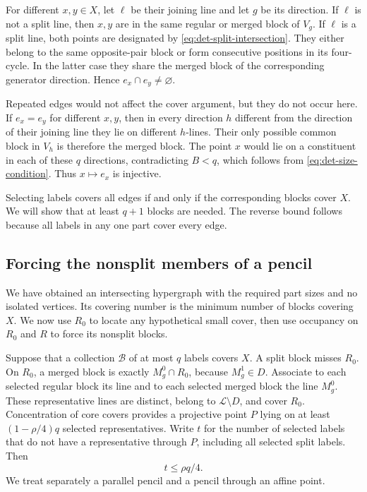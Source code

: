 For different $x,y\in X$, let $\ell$ be their joining line and let $g$
be its direction.  If $\ell$ is not a split line, then $x,y$ are in the
same regular or merged block of $V_g$.  If $\ell$ is a split line, both
points are designated by \eqref{eq:det-split-intersection}.  They either
belong to the same opposite-pair block or form consecutive positions in
its four-cycle.  In the latter case they share the merged block of the
corresponding generator direction.  Hence $e_x\cap e_y\ne\varnothing$.

Repeated edges would not affect the cover argument, but they do not
occur here.  If $e_x=e_y$ for different $x,y$, then in every direction
$h$ different from the direction of their joining line they lie on
different $h$-lines.  Their only possible common block in $V_h$ is
therefore the merged block.  The point $x$ would lie on a constituent in
each of these $q$ directions, contradicting $B<q$, which follows from
\eqref{eq:det-size-condition}.  Thus $x\mapsto e_x$ is injective.

Selecting labels covers all edges if and only if the corresponding
blocks cover $X$.  We will show that at least $q+1$ blocks are needed.
The reverse bound follows because all labels in any one part cover every
edge.

\subsection{Forcing the nonsplit members of a pencil}

We have obtained an intersecting hypergraph with the required part sizes
and no isolated vertices. Its covering number is the minimum number of
blocks covering $X$. We now use $R_0$ to locate any hypothetical small
cover, then use occupancy on $R_0$ and $R$ to force its nonsplit blocks.

Suppose that a collection $\mathcal B$ of at most $q$ labels covers $X$.
A split block misses $R_0$.  On $R_0$, a merged block is exactly
$M_g^0\cap R_0$, because $M_g^1\in D$.  Associate to each selected
regular block its line and to each selected merged block the line
$M_g^0$.  These representative lines are distinct, belong to
$\mathcal L\setminus D$, and cover $R_0$.  Concentration of core covers
provides a projective point $P$ lying on at least $(1-\rho/4)q$ selected
representatives.  Write $t$ for the number of selected labels that do not
have a representative through $P$, including all selected split labels.
Then
\begin{equation}
 t\leq\rho q/4.
 \label{eq:det-outside-pencil}
\end{equation}
We treat separately a parallel pencil and a pencil through an affine
point.

